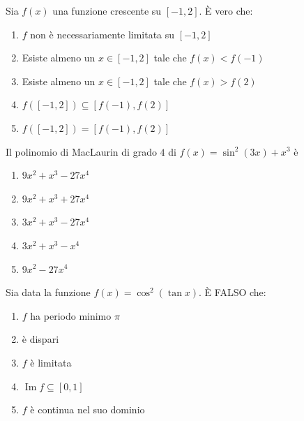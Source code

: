\begin{quiz}
Sia $f(x)$ una funzione crescente su $[-1,2]$. \`E vero che:
\begin{enumerate}
\item $f$ non \`e necessariamente limitata su $[-1,2]$
\item Esiste almeno un $x\in[-1,2]$ tale che $f(x)<f(-1)$
\item Esiste almeno un $x\in[-1,2]$ tale che $f(x)>f(2)$
\item $f([-1,2])\subseteq[f(-1),f(2)]$
\item $f([-1,2])=[f(-1),f(2)]$
\end{enumerate}
\end{quiz}

\begin{quiz}
Il polinomio di MacLaurin di grado $4$ di $f(x)=\sin^2(3x)+x^3$ \`e
\begin{enumerate}
\item $9x^2+x^3-27x^4$
\item $9x^2+x^3+27x^4$
\item $3x^2+x^3-27x^4$
\item $3x^2+x^3-x^4$
\item $9x^2-27x^4$
\end{enumerate}
\end{quiz}

\begin{quiz}
Sia data la funzione $f(x)=\cos^2(\tan x)$. \`E FALSO che:
\begin{enumerate}
\item $f$ ha periodo minimo $\pi$
\item \`e dispari
\item $f$ \`e limitata
\item $\operatorname{Im} f\subseteq[0,1]$
\item $f$ \`e continua nel suo dominio
\end{enumerate}
\end{quiz}

